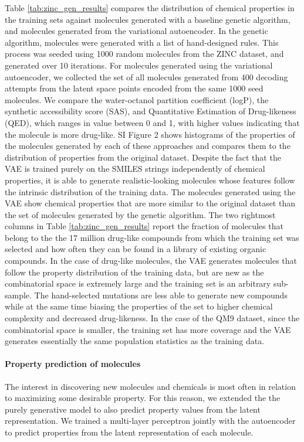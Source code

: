 Table \ref{tab:zinc_gen_results} compares the distribution of chemical properties in the training sets against molecules generated with a baseline genetic algorithm, and molecules generated from the variational autoencoder. In the genetic algorithm, molecules were generated with a list of hand-designed rules\cite{Virshup_2013, Rupakheti_2015, Reymond_2015, Reymond_2010,kanal_2013_efficient,oboyle_2011_computational}. This process was seeded using 1000 random molecules from the ZINC dataset, and generated over 10 iterations. For molecules generated using the variational autoencoder, we collected the set of all molecules generated from 400 decoding attempts from the latent space points encoded from the same 1000 seed molecules.
We compare the water-octanol partition coefficient (logP), the synthetic accessibility score (SAS),\cite{Ertl2009estimation} and Quantitative Estimation of Drug-likeness (QED),\cite{bickerton2012quantifying} which ranges in value between 0 and 1, with higher values indicating that the molecule is more drug-like. SI Figure 2 shows histograms of the properties of the molecules generated by each of these approaches and compares them to the distribution of properties from the original dataset. Despite the fact that the VAE is trained purely on the SMILES strings independently of chemical properties, it is able to generate realistic-looking molecules whose features follow the intrinsic distribution of the training data. The molecules generated using the VAE show chemical properties that are more similar to the original dataset than the set of molecules generated by the genetic algorithm.
The two rightmost columns in Table \ref{tab:zinc_gen_results} report the fraction of molecules that belong to the the 17 million drug-like compounds from which the training set was selected and how often they can be found in a library of existing organic compounds. In the case of drug-like molecules, the VAE generates molecules that follow the property distribution of the training data, but are new as the combinatorial space is extremely large and the training set is an arbitrary sub-sample. The hand-selected mutations are less able to generate new compounds while at the same time biasing the properties of the set to higher chemical complexity and decreased drug-likeness. In the case of the QM9 dataset, since the combinatorial space is smaller, the training set has more coverage and the VAE generates essentially the same population statistics as the training data.
 
\paragraph{Property prediction of molecules}
The interest in discovering new molecules and chemicals is most often in relation to maximizing some desirable property. For this reason, we extended the the purely generative model to also predict property values from the latent representation. We trained a multi-layer perceptron jointly with the autoencoder to predict properties from the latent representation of each molecule.

